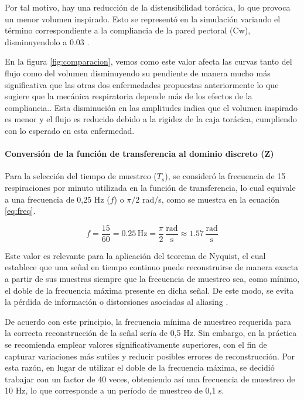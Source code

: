 \documentclass[journal]{IEEEtran}
\begin{document}
Por tal motivo, hay una reducción de la distensibilidad torácica, lo que provoca un menor volumen inspirado. Esto se representó en la simulación variando el término correspondiente a la compliancia de la pared pectoral (Cw), disminuyendolo a 0.03 \cite{nguyen2010respiratory}.

En la figura \ref{fig:comparacion}, vemos como este valor afecta las curvas tanto del flujo como del volumen disminuyendo su pendiente de manera mucho más significativa que las otras dos enfermedades propuestas anteriormente lo que sugiere que la mecánica respiratoria depende más de los efectos de la compliancia.. Esta disminución en las amplitudes indica que el volumen inspirado es menor y el flujo es reducido debido a la rigidez de la caja torácica, cumpliendo con lo esperado en esta enfermedad. \bigskip


\paragraph{\textbf{Conversión de la función de transferencia al dominio discreto (Z)}}

Para la selección del tiempo de muestreo ($T_s$), se consideró la frecuencia de 15 respiraciones por minuto utilizada en la función de transferencia, lo cual equivale a una frecuencia de 0,25 Hz ($f$) o $\pi/2$ rad/s, como se muestra en la ecuación \ref{eq:freq}.

\begin{equation}
    f = \frac{15}{60} = 0.25 \,\text{Hz} = \frac{\pi}{2} \,\frac{\text{rad}}{\text{s}} \approx 1.57 \,\frac{\text{rad}}{\text{s}}
    \label{eq:freq}
\end{equation}

Este valor es relevante para la aplicación del teorema de Nyquist, el cual establece que una señal en tiempo continuo puede reconstruirse de manera exacta a partir de sus muestras siempre que la frecuencia de muestreo sea, como mínimo, el doble de la frecuencia máxima presente en dicha señal. De este modo, se evita la pérdida de información o distorsiones asociadas al aliasing \cite{academialab2025nyquist}.

De acuerdo con este principio, la frecuencia mínima de muestreo requerida para la correcta reconstrucción de la señal sería de 0,5 Hz. Sin embargo, en la práctica se recomienda emplear valores significativamente superiores, con el fin de capturar variaciones más sutiles y reducir posibles errores de reconstrucción. Por esta razón, en lugar de utilizar el doble de la frecuencia máxima, se decidió trabajar con un factor de 40 veces, obteniendo así una frecuencia de muestreo de 10 Hz, lo que corresponde a un período de muestreo de 0,1 s.
\end{document}
